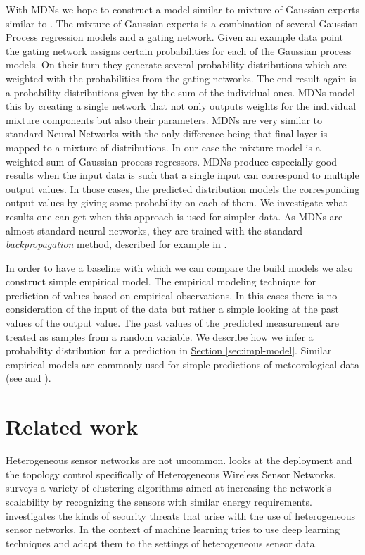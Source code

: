 \documentclass[12pt,a4paper,twoside]{scrartcl}
\numberwithin{equation}{section}
\newcommand{\refsec}[1]{\hyperref[#1]{Section \ref*{#1}}}
\begin{document}
With MDNs we hope to construct a model similar to mixture of Gaussian  experts similar to \cite{rasmussen2002}. The mixture of Gaussian experts is a combination of several Gaussian Process regression models and a gating network. Given an example data point the gating network assigns certain probabilities for each of the Gaussian process models. On their turn they generate several probability distributions which are weighted with the probabilities from the gating networks. The end result again is a probability distributions given by the sum of the individual ones. MDNs model this by creating a single network that not only outputs weights for the individual mixture components but also their parameters. MDNs are very similar to standard Neural Networks with the only difference being that final layer is mapped to a mixture of distributions. In our case the mixture model is a weighted sum of Gaussian process regressors. MDNs produce especially good results when the input data is such that a single input can correspond to multiple output values. In those cases, the predicted distribution models the corresponding output values by giving some probability on each of them. We investigate what results one can get when this approach is used for simpler data. As MDNs are almost standard neural networks, they are trained with the standard \emph{backpropagation} method, described for example in \cite{bertels2001}.

In order to have a baseline with which we can compare the build models we also construct simple empirical model. The empirical modeling technique for prediction of values based on empirical observations. In this cases there is no consideration of the input of the data but rather a simple looking at the past values of the output value. The past values of the predicted measurement are treated as samples from a random variable. We describe how we infer a probability distribution for a prediction in \refsec{sec:impl-model}. Similar empirical models are commonly used for simple predictions of meteorological data (see \cite{krueger2011} and \cite{eden2015}). 

\section{Related work}
\label{sec:related-work}

Heterogeneous sensor networks are not uncommon. \cite{wu2007} looks at the deployment and the topology control specifically of Heterogeneous Wireless Sensor Networks. \cite{katiyar2010} surveys a variety of clustering algorithms aimed at increasing the  network's scalability by recognizing the sensors with similar energy requirements. \cite{uplap2014} investigates the kinds of security threats that arise with the use of heterogeneous sensor networks. In the context of machine learning \cite{liu2017} tries to use deep learning techniques and adapt them to the settings of heterogeneous sensor data.
\end{document}
